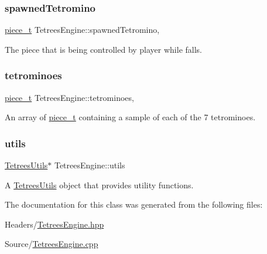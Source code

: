 \subsubsection{\texorpdfstring{spawned\+Tetromino}{spawnedTetromino}}
{\footnotesize\ttfamily \mbox{\hyperlink{structpiece__t}{piece\+\_\+t}} Tetrees\+Engine\+::spawned\+Tetromino\hspace{0.3cm}{\ttfamily [static]}, {\ttfamily [private]}}

The piece that is being controlled by player while falls. \mbox{\label{classTetreesEngine_a07ae13fb62e86b45c834947243a913df}} 
\subsubsection{\texorpdfstring{tetrominoes}{tetrominoes}}
{\footnotesize\ttfamily \mbox{\hyperlink{structpiece__t}{piece\+\_\+t}} Tetrees\+Engine\+::tetrominoes\hspace{0.3cm}{\ttfamily [static]}, {\ttfamily [private]}}

An array of \mbox{\hyperlink{structpiece__t}{piece\+\_\+t}} containing a sample of each of the 7 tetrominoes. \mbox{\label{classTetreesEngine_ac4d6256982306ab8a02e18793cb803c0}} 
\subsubsection{\texorpdfstring{utils}{utils}}
{\footnotesize\ttfamily \mbox{\hyperlink{classTetreesUtils}{Tetrees\+Utils}}$\ast$ Tetrees\+Engine\+::utils\hspace{0.3cm}{\ttfamily [private]}}

A \mbox{\hyperlink{classTetreesUtils}{Tetrees\+Utils}} object that provides utility functions. 

The documentation for this class was generated from the following files\+:\begin{DoxyCompactItemize}
\item 
Headers/\mbox{\hyperlink{TetreesEngine_8hpp}{Tetrees\+Engine.\+hpp}}\item 
Source/\mbox{\hyperlink{TetreesEngine_8cpp}{Tetrees\+Engine.\+cpp}}\end{DoxyCompactItemize}
